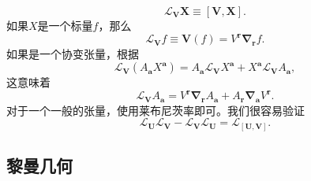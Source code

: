 \begin{equation*}
	\mathcal{L}_{\boldsymbol{V}}\boldsymbol{X} \equiv [\boldsymbol{V} ,\boldsymbol{X}] .
\end{equation*}
如果$X$是一个标量$f$，那么
\begin{equation*}
	\mathcal{L}_{\boldsymbol{V}} f\equiv \boldsymbol{V}( f) =V^{\boldsymbol{r}}\boldsymbol{\nabla }_{\boldsymbol{r}} f.
\end{equation*}
如果是一个协变张量，根据
\begin{equation*}
	\mathcal{L}_{\boldsymbol{V}} (A_{\boldsymbol{a}} X^{\boldsymbol{a}} )=A_{\boldsymbol{a}}\mathcal{L}_{\boldsymbol{V}} X^{\boldsymbol{a}} +X^{\boldsymbol{a}}\mathcal{L}_{\boldsymbol{V}} A_{\boldsymbol{a}} ,
\end{equation*}
这意味着
\begin{equation*}
	\mathcal{L}_{\boldsymbol{V}} A_{\boldsymbol{a}} =V^{\boldsymbol{r}}\boldsymbol{\nabla }_{\boldsymbol{r}} A_{\boldsymbol{a}} +A_{\boldsymbol{r}}\boldsymbol{\nabla }_{\boldsymbol{a}} V^{\boldsymbol{r}} .
\end{equation*}
对于一个一般的张量，使用莱布尼茨率即可。我们很容易验证
\begin{equation*}
	\mathcal{L}_{\boldsymbol{U}}\mathcal{L}_{\boldsymbol{V}} -\mathcal{L}_{\boldsymbol{V}}\mathcal{L}_{\boldsymbol{U}} =\mathcal{L}_{[\boldsymbol{U} ,\boldsymbol{V}]} .
\end{equation*}


\subsection{黎曼几何}

